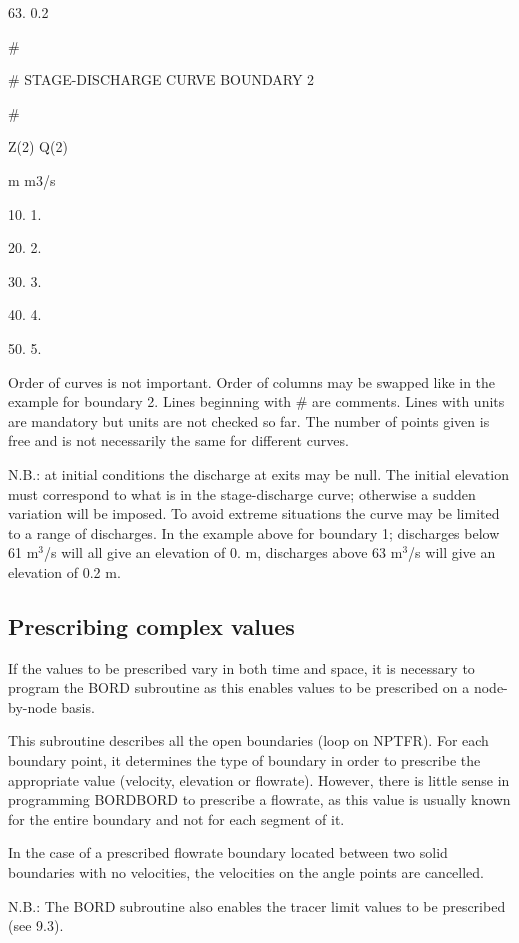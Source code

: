  63.       0.2

 \#

 \#  STAGE-DISCHARGE CURVE BOUNDARY 2

 \#

 Z(2)     Q(2)

 m      m3/s

 10.       1.

 20.       2.

 30.       3.

 40.       4.

 50.       5.

 Order of curves is not important. Order of columns may be swapped like in the example for boundary 2. Lines beginning with \# are comments. Lines with units are mandatory but units are not checked so far. The number of points given is free and is not necessarily the same for different curves.

 N.B.: at initial conditions the discharge at exits may be null. The initial elevation must correspond to what is in the stage-discharge curve; otherwise a sudden variation will be imposed. To avoid extreme situations the curve may be limited to a range of discharges. In the example above for boundary 1; discharges below 61 m${}^{3}$/s will all give an elevation of 0. m, discharges above 63 m${}^{3}$/s will give an elevation of 0.2 m.


\subsection{ Prescribing complex values}

 If the values to be prescribed vary in both time and space, it is necessary to program the BORD subroutine as this enables values to be prescribed on a node-by-node basis.

 This subroutine describes all the open boundaries (loop on NPTFR). For each boundary point, it determines the type of boundary in order to prescribe the appropriate value (velocity, elevation or flowrate). However, there is little sense in programming BORDBORD to prescribe a flowrate, as this value is usually known for the entire boundary and not for each segment of it.

 In the case of a prescribed flowrate boundary located between two solid boundaries with no velocities, the velocities on the angle points are cancelled.

 N.B.: The BORD subroutine also enables the tracer limit values to be prescribed (see 9.3).



